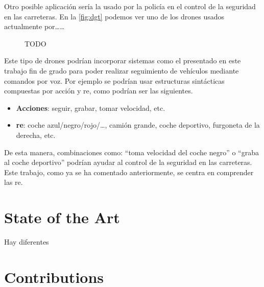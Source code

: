 Otro posible aplicación sería la usado por la policía en el control de la
seguridad en las carreteras. En la \vref{fig:dgt} podemos ver uno de los drones
usados actualmente por\ldots\ldots

\begin{figure}[ht]
  \centering
  \caption[TODO]{TODO}
  \label{fig:dgt}
\end{figure}


Este tipo de drones podrían incorporar sistemas como el presentado en este
trabajo fin de grado para poder realizar seguimiento de vehículos mediante
comandos por voz. Por ejemplo se podrían usar estructuras sintácticas
compuestas por acción y \gls{re}, como podrían ser las siguientes.

\begin{itemize}
  \item \textbf{Acciones}: seguir, grabar, tomar velocidad, etc.
  \item \textbf{\gls*{re}}: coche azul/negro/rojo/\ldots, camión grande, coche
  deportivo, furgoneta de la derecha, etc.
\end{itemize}

De esta manera, combinaciones como: ``toma velocidad del coche negro'' o
``graba al coche deportivo'' podrían ayudar al control de la seguridad en las
carreteras. Este trabajo, como ya se ha comentado anteriormente, se centra en
comprender las \gls{re}.


\section{State of the Art}

Hay diferentes


\section{Contributions}
